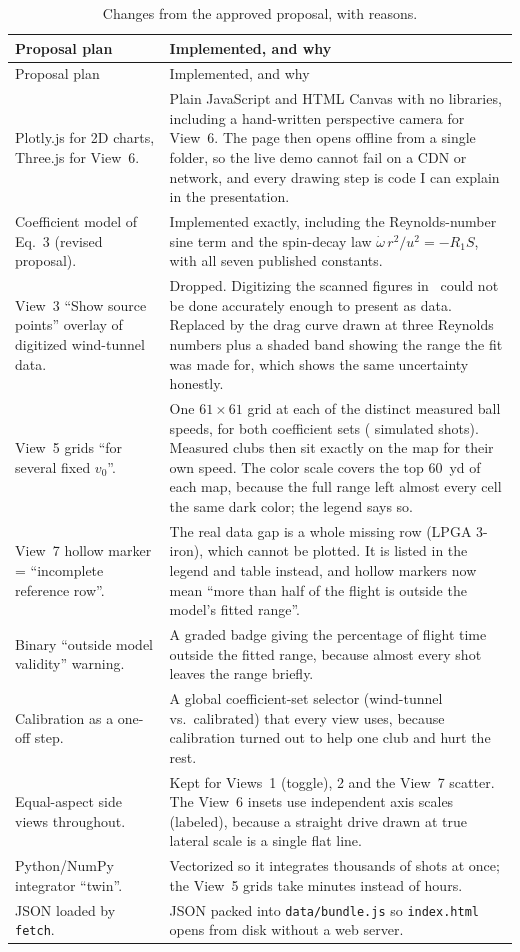 \documentclass[11pt]{article}
\begin{document}
\begin{longtable}{@{}p{}p{}@{}}
\caption{Changes from the approved proposal, with reasons.}\label{tab:changes}\\
\toprule
Proposal plan & Implemented, and why \\
\midrule
\endfirsthead
\toprule Proposal plan & Implemented, and why \\ \midrule \endhead
Plotly.js for 2D charts, Three.js for View~6. &
Plain JavaScript and HTML Canvas with no libraries, including a hand-written perspective camera for
View~6. The page then opens offline from a single folder, so the live demo cannot fail on a CDN or
network, and every drawing step is code I can explain in the presentation. \\
Coefficient model of Eq.~3 (revised proposal). & Implemented exactly, including the Reynolds-number
sine term and the spin-decay law $\dot\omega\,r^2/u^2=-R_1S$, with all seven published constants. \\
View~3 ``Show source points'' overlay of digitized wind-tunnel data. & Dropped. Digitizing the
scanned figures in~\cite{smits1994} could not be done accurately enough to present as data.
Replaced by the drag curve drawn at three Reynolds numbers plus a shaded band showing the range the
fit was made for, which shows the same uncertainty honestly. \\
View~5 grids ``for several fixed $v_0$''. & One $61\times61$ grid at each of the \NSpeeds{} distinct
measured ball speeds, for both coefficient sets (\NGridRuns{} simulated shots). Measured clubs then
sit exactly on the map for their own speed. The color scale covers the top \SI{60}{yd} of each map,
because the full range left almost every cell the same dark color; the legend says so. \\
View~7 hollow marker = ``incomplete reference row''. & The real data gap is a whole missing row
(LPGA 3-iron), which cannot be plotted. It is listed in the legend and table instead, and hollow
markers now mean ``more than half of the flight is outside the model's fitted range''. \\
Binary ``outside model validity'' warning. & A graded badge giving the percentage of flight time
outside the fitted range, because almost every shot leaves the range briefly. \\
Calibration as a one-off step. & A global coefficient-set selector (wind-tunnel vs.\ calibrated)
that every view uses, because calibration turned out to help one club and hurt the rest. \\
Equal-aspect side views throughout. & Kept for Views~1 (toggle), 2 and the View~7 scatter. The
View~6 insets use independent axis scales (labeled), because a straight drive drawn at true
lateral scale is a single flat line. \\
Python/NumPy integrator ``twin''. & Vectorized so it integrates thousands of shots at once; the
View~5 grids take minutes instead of hours. \\
JSON loaded by \texttt{fetch}. & JSON packed into \texttt{data/bundle.js} so \texttt{index.html}
opens from disk without a web server. \\
\bottomrule
\end{longtable}
\end{document}
